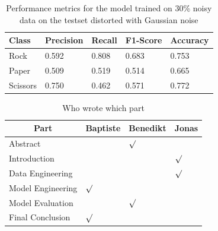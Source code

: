 \documentclass[a4paper]{article}
\begin{document}
\begin{table}[H]
	\centering
	\caption{Performance metrics for the model trained on 30\% noisy data on the testset distorted with Gaussian noise}
	\label{tbl:noisy_model_Gauss}
	\begin{tabular}{@{}lllll@{}}
		\toprule
		Class    & Precision & Recall & F1-Score & Accuracy \\ \midrule
		Rock     & 0.592     & 0.808  & 0.683    & 0.753    \\
		Paper    & 0.509     & 0.519  & 0.514    & 0.665    \\
		Scissors & 0.750     & 0.462  & 0.571    & 0.772    \\ \bottomrule
	\end{tabular}
\end{table}

\begin{table}[H]
\caption{Who wrote which part}
\label{tbl:who}
\centering
\begin{tabular}{@{}llll@{}}
\toprule
\multicolumn{1}{c}{Part} & Baptiste   & Benedikt  & Jonas  \\ \midrule
Abstract                     			& & $\surd$  & \\
Introduction                 			&   &  & $\surd$ \\
Data Engineering             			&   &  & $\surd$ \\
Model Engineering 						& $\surd$ & & \\ 
Model Evaluation 						& & $\surd$  & \\
Final Conclusion						& $\surd$ & & \\ 
\bottomrule
\end{tabular}
\end{table}
\end{document}

